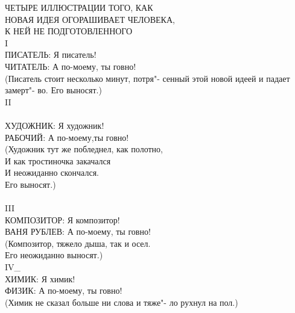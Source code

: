 ЧЕТЫРЕ ИЛЛЮСТРАЦИИ ТОГО, КАК \\
    \hspace{1cm}НОВАЯ ИДЕЯ ОГОРАШИВАЕТ ЧЕЛОВЕКА, \\
        \hspace{2cm}К НЕЙ НЕ ПОДГОТОВЛЕННОГО \\
I \\
ПИСАТЕЛЬ: Я писатель! \\
ЧИТАТЕЛЬ: А по-моему, ты говно! \\
    \hspace{1cm}(Писатель стоит несколько минут,  потря"-
    сенный этой новой идеей и падает замерт"-
    во. Его выносят.)\\
II \\
\\
ХУДОЖНИК: Я художник! \\
РАБОЧИЙ: А по-моему,ты говно! \\
    \hspace{1cm}(Художник тут же побледнел, как полотно, \\
    \hspace{1cm}И как тростиночка  закачался \\
    \hspace{1cm}И неожиданно скончался. \\
    \hspace{1cm}Его выносят.) \\
\\
III \\
КОМПОЗИТОР: Я композитор! \\
ВАНЯ РУБЛЕВ: А по-моему, ты говно! \\
    \hspace{1cm}(Композитор,  тяжело  дыша,  так и осел. \\
    \hspace{1cm}Его неожиданно выносят.) \\
IV\_ \\
ХИМИК: Я химик! \\
ФИЗИК: А по-моему, ты говно! \\
    \hspace{1cm}(Химик не сказал больше ни слова и тяже"-
    ло рухнул на пол.)